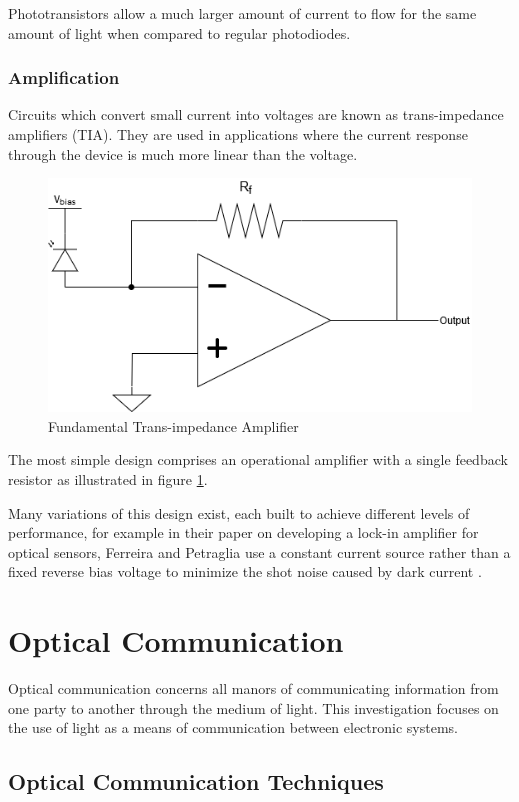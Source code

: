 Phototransistors allow a much larger amount of current to flow for the same amount of light when compared to regular photodiodes.

\subsubsection{Amplification}

Circuits which convert small current into voltages are known as trans-impedance amplifiers (TIA). They are used in applications where the current response through the device is much more linear than the voltage.

\begin{figure}[H]
	\centering
	\includegraphics[width=0.6\linewidth]{figures/litreview/transimpedance_amplifier.png}
	\caption{Fundamental Trans-impedance Amplifier}
	\label{fig:transimpedance_amplifier}
\end{figure}

The most simple design comprises an operational amplifier with a single feedback resistor as illustrated in figure \ref{fig:transimpedance_amplifier}.

Many variations of this design exist, each built to achieve different levels of performance, for example in their paper on developing a lock-in amplifier for optical sensors, Ferreira and Petraglia use a constant current source rather than a fixed reverse bias voltage to minimize the shot noise caused by dark current \cite{Ferreira2017}.




\section{Optical Communication}
Optical communication concerns all manors of communicating information from one party to another through the medium of light. This investigation focuses on the use of light as a means of communication between electronic systems.

\subsection{Optical Communication Techniques} %

